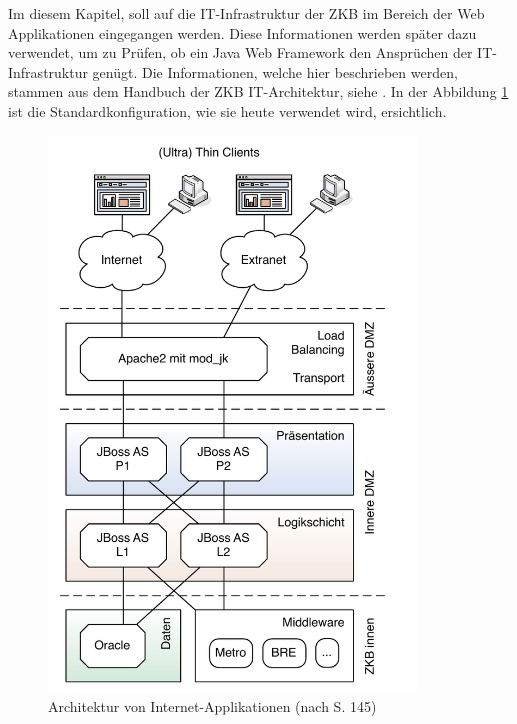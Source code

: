   Im diesem Kapitel, soll auf die IT-Infrastruktur der \ac{ZKB} im Bereich der
  Web Applikationen eingegangen werden. Diese Informationen werden später dazu
  verwendet, um zu Prüfen, ob ein Java Web Framework den Ansprüchen der
  IT-Infrastruktur genügt. Die Informationen, welche hier beschrieben werden,
  stammen aus dem Handbuch der ZKB IT-Architektur, siehe
  \cite{ZkbHandbuchDerItArchitektur}. In der Abbildung
  \ref{img:infrastrukturZkb} ist die Standardkonfiguration, wie sie heute
  verwendet wird, ersichtlich.
  
  \begin{figure}[ht]
    \begin{center}
      \includegraphics[width=0.87\textwidth]{./image/infrastrukturZkb.pdf}
      \caption{Architektur von Internet-Applikationen (nach
      \cite{ZkbHandbuchDerItArchitektur} S. 145)}
      \label{img:infrastrukturZkb}
    \end{center}
  \end{figure}
  
